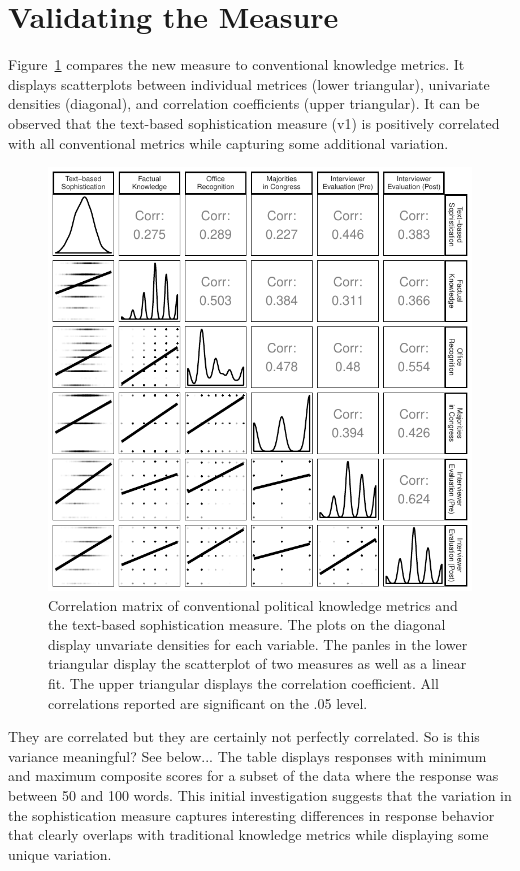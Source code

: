 \documentclass[12pt]{article}
\begin{document}
\section*{Validating the Measure}

Figure~\ref{fig:corplot} compares the new measure to conventional knowledge metrics. It  displays scatterplots between individual metrices (lower triangular), univariate densities (diagonal), and correlation coefficients (upper triangular). It can be observed that the text-based sophistication measure (v1) is positively correlated with all conventional metrics while capturing some additional variation.

\begin{figure}[h]\centering
\includegraphics{../fig/corplot.pdf}
\caption{Correlation matrix of conventional political knowledge metrics and the text-based sophistication measure. The plots on the diagonal display unvariate densities for each variable. The panles in the lower triangular display the scatterplot of two measures as well as a linear fit. The upper triangular displays the correlation coefficient. All correlations reported are significant on the .05 level.}\label{fig:corplot}
\end{figure}


They are correlated but they are certainly not perfectly correlated. So is this variance meaningful? See below... The table displays responses with minimum and maximum composite scores for a subset of the data where the response was between 50 and 100 words. This initial investigation suggests that the variation in the sophistication measure captures interesting differences in response behavior that clearly overlaps with traditional knowledge metrics while displaying some unique variation.
\end{document}
